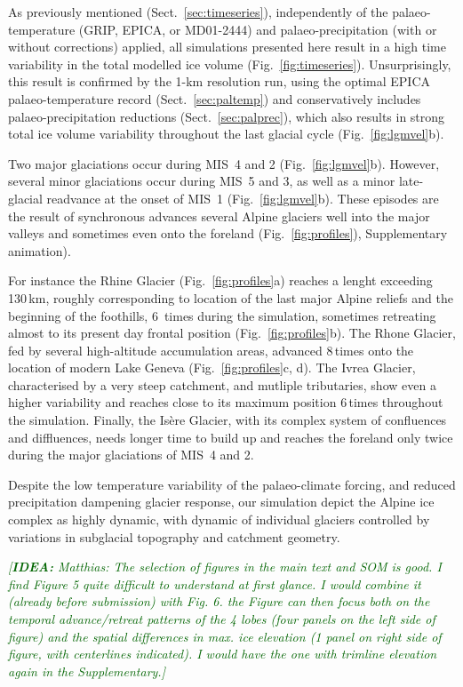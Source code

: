 \documentclass[tc, manuscript]{copernicus}
\newcommand{\idea}[1]{\textcolor{darkgreen}{\emph{[\textbf{IDEA:} #1]}}}
\begin{document}
    As previously mentioned (Sect.~\ref{sec:timeseries}), independently of the
    palaeo-temperature (GRIP, EPICA, or MD01-2444) and palaeo-precipitation
    (with or without corrections) applied, all simulations presented here
    result in a high time variability in the total modelled ice volume
    (Fig.~\ref{fig:timeseries}). Unsurprisingly, this result is confirmed by
    the 1-km resolution run, using the optimal EPICA palaeo-temperature record
    (Sect.~\ref{sec:paltemp}) and conservatively includes palaeo-precipitation
    reductions (Sect.~\ref{sec:palprec}), which also results in strong total
    ice volume variability throughout the last glacial cycle
    (Fig.~\ref{fig:lgmvel}b).

    Two major glaciations occur during MIS~4 and 2 (Fig.~\ref{fig:lgmvel}b).
    However, several minor glaciations occur during MIS~5 and 3, as well as a
    minor late-glacial readvance at the onset of MIS~1
    (Fig.~\ref{fig:lgmvel}b). These episodes are the result of synchronous
    advances several Alpine glaciers well into the major valleys and sometimes
    even onto the foreland (Fig.~\ref{fig:profiles}), Supplementary animation).

    For instance the Rhine Glacier (Fig.~\ref{fig:profiles}a) reaches a lenght
    exceeding 130\,km, roughly corresponding to location of the last major
    Alpine reliefs and the beginning of the foothills, 6~times during the
    simulation, sometimes retreating almost to its present day frontal position
    (Fig.~\ref{fig:profiles}b). The Rhone Glacier, fed by several high-altitude
    accumulation areas, advanced 8\,times onto the location of modern Lake
    Geneva (Fig.~\ref{fig:profiles}c, d). The Ivrea Glacier, characterised by
    a very steep catchment, and mutliple tributaries, show even a higher
    variability and reaches close to its maximum position 6\,times throughout
    the simulation. Finally, the Isère Glacier, with its complex system of
    confluences and diffluences, needs longer time to build up and reaches the
    foreland only twice during the major glaciations of MIS~4 and 2.

    Despite the low temperature variability of the palaeo-climate forcing, and
    reduced precipitation dampening glacier response, our simulation depict
    the Alpine ice complex as highly dynamic, with dynamic of individual
    glaciers controlled by variations in subglacial topography and catchment
    geometry.

    \idea{Matthias: The selection of figures in the main text and SOM is good.
          I find Figure 5 quite difficult to understand at first glance. I
          would combine it (already before submission) with Fig. 6. the Figure
          can then focus both on the temporal advance/retreat patterns of the 4
          lobes (four panels on the left side of figure) and the spatial
          differences in max. ice elevation (1 panel on right side of figure,
          with centerlines indicated). I would have the one with trimline
          elevation again in the Supplementary.}
\end{document}
